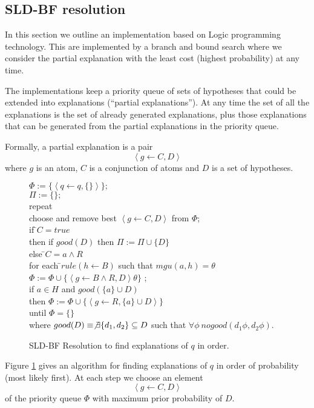 \subsection{SLD-BF resolution}\label{implementation}
In this section we outline an implementation based on 
Logic programming technology. This are
implemented by a branch and bound search where we consider the partial
explanation with the least cost (highest probability) at any time.

The implementations keep a priority queue of sets of
hypotheses that could be extended into explanations (``partial
explanations''). At any time the set of all the explanations is the
set of already generated explanations, plus those explanations that
can be generated from the partial explanations in the priority queue.

Formally, a partial explanation is a pair
\[\left<g \leftarrow C , D\right>\]
where $g$ is an atom, $C$ is a conjunction of atoms and $D$ is a set
of hypotheses. 

\begin{figure} 
\begin{tabbing}
$\Phi := \{\left<q \leftarrow q , \{\}\right>\};$\\
$\Pi := \{\};$\\
repeat\=\\
\>choose and remove best $\left<g \leftarrow C , D\right>$ from $\Phi$;\\
\>if \=$C=true$\\
\>\>then if $good(D)$ then $\Pi := \Pi \cup \{D\}$\\
\>\>else \=$C =a\wedge R$\\
\>\>\>for each \=$rule(h\leftarrow B)$ such that $mgu(a,h)=\theta$\\
\>\>\>\>$\Phi := \Phi \cup \{\left<g \leftarrow B \wedge R ,
D\right>\theta\}$ ;\\ 
\>\>\>if $a \in H$ and $good(\{a\}\cup D)$\\
\>\>\>\> then $\Phi := \Phi \cup \{\left<g \leftarrow R , \{a\}\cup
D\right>\}$ \\ 
until $\Phi = \{\}$\\
where $good(D)\equiv \not \exists \{d_1,d_2\}\subseteq D$ such that $\forall \phi \ nogood(d_1\phi,d_2\phi).$
\end{tabbing}
\caption{SLD-BF Resolution to find explanations of $q$ in order.}
\label{basic-top-down} 
\end{figure}

Figure \ref{basic-top-down} gives an algorithm for finding
explanations of $q$ in order of probability (most likely first).
At each step we choose an element
\[\left<g \leftarrow C , D\right>\]
of the priority queue $\Phi$ with maximum prior probability of $D$.


